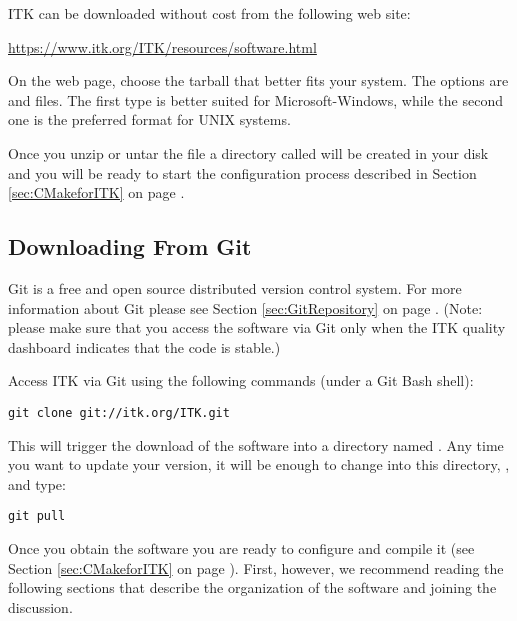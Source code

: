 
ITK can be downloaded without cost from the following web site:
\begin{center}
  \url{https://www.itk.org/ITK/resources/software.html}
\end{center}

On the web page, choose the tarball that better fits your system. The options are
 and  files. The first type is better suited for
Microsoft-Windows, while the second one is the preferred format for UNIX
systems.

Once you unzip or untar the file a directory called
 will be created in your disk and
you will be ready to start the configuration process described in Section
\ref{sec:CMakeforITK} on page \pageref{sec:CMakeforITK}.

\subsection{Downloading From Git}
\label{sec:DownloadingFromGit}


Git is a free and open source distributed version control system.  For more
information about Git please see Section \ref{sec:GitRepository} on page
\pageref{sec:GitRepository}. (Note: please make sure that you access the
software via Git only when the ITK quality dashboard indicates that the code
is stable.)

Access ITK via Git using the following commands (under a Git Bash shell):
\begin{verbatim}
git clone git://itk.org/ITK.git
\end{verbatim}

This will trigger the download of the software into a directory named
.  Any time you want to update your version, it will be enough to
change into this directory, , and type:
\begin{verbatim}
git pull
\end{verbatim}

Once you obtain the software you are ready to configure and compile it (see
Section \ref{sec:CMakeforITK} on page \pageref{sec:CMakeforITK}). First,
however, we recommend reading the following sections that describe the
organization of the software and joining the discussion.

